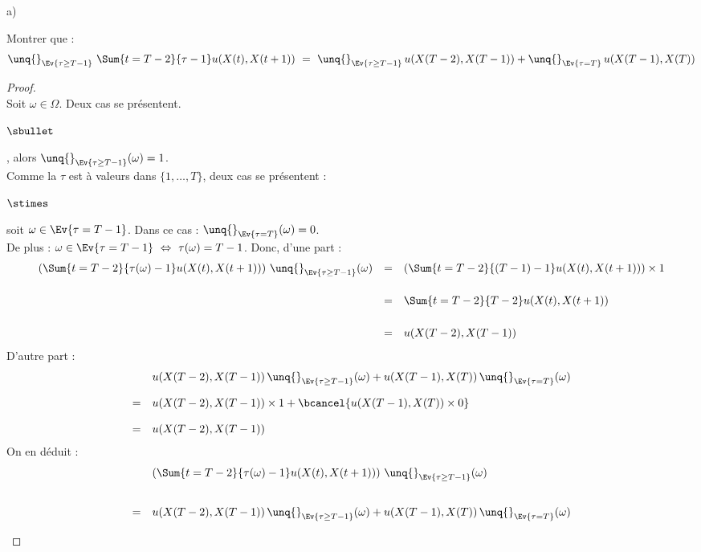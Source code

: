 \documentclass[11pt]{article}%
\begin{document}
  
  
  
  \begin{noliste}{a)}
    \setlength{\itemsep}{2mm}
    \item Montrer que :
    \[
      \unq{}_{\Ev{\tau \geq T-1}} \ \Sum{t=T-2}{\tau-1} 
      u(X(t),X(t+1))
      \ = \ \unq{}_{\Ev{\tau \geq T-1}} \, u(X(T-2),X(T-1)) + 
      \unq{}_{\Ev{\tau = T}} \, u(X(T-1),X(T))
    \]
    
    \begin{proof}~\\
      Soit $\omega \in \Omega$. Deux cas se présentent.
      \begin{noliste}{$\sbullet$}
        \item {}, alors
        $\unq{}_{\Ev{\tau \geq T-1}}(\omega)=1$.\\[.1cm]
        Comme la \var $\tau$ est à valeurs dans $\{1, \ldots , T\}$, 
        deux cas se présentent :
        \begin{noliste}{$\stimes$}
	  \item soit $\omega \in \Ev{\tau = T-1}$. Dans ce cas : 
	  $\unq{}_{\Ev{\tau = T}}(\omega)=0$.\\
	  De plus : $\omega \in \Ev{\tau = T-1} \ \Leftrightarrow \
	  \tau(\omega) = T-1$. Donc, d'une part :
	  \[
	    \begin{array}{rcl}
	      \left(\Sum{t=T-2}{\tau(\omega)-1} u(X(t),X(t+1))\right)
	      \, \unq{}_{\Ev{\tau \geq T-1}}(\omega) 
	      &=&
	      \left(\Sum{t=T-2}{(T-1)-1} u(X(t),X(t+1))\right)
	      \times 1
	      \\[.6cm]
	      &=& \Sum{t=T-2}{T-2} u(X(t),X(t+1))
	      \\[.6cm]
	      &=& u(X(T-2),X(T-1))
	    \end{array}
	  \]
	  D'autre part :
	  \[
	    \begin{array}{cl}
	      & u(X(T-2),X(T-1)) \, \unq{}_{\Ev{\tau \geq T-1}}
	      (\omega) + u(X(T-1),X(T)) \, \unq{}_{\Ev{\tau =T}}
	      (\omega)
	      \\[.4cm]
	      =& u(X(T-2),X(T-1)) \times 1 + \bcancel{u(X(T-1),X(T))
	      \times 0}
	      \\[.4cm]
	      =& u(X(T-2),X(T-1))
	    \end{array}
	  \]
	  On en déduit :
	  \[
	    \begin{array}{cl}
	      & \left( \Sum{t=T-2}{\tau(\omega)-1} 
	      u(X(t),X(t+1))\right)   \,
	      \unq{}_{\Ev{\tau \geq T-1}}(\omega)
	      \\[.8cm]
	      =& u(X(T-2),X(T-1)) \, \unq{}_{\Ev{\tau \geq T-1}}(\omega)
	      + u(X(T-1),X(T)) \, \unq{}_{\Ev{\tau =T}}(\omega)
	    \end{array}
	  \]
	  

\end{noliste}
\end{noliste}
\end{proof}
\end{noliste}
\end{document}
